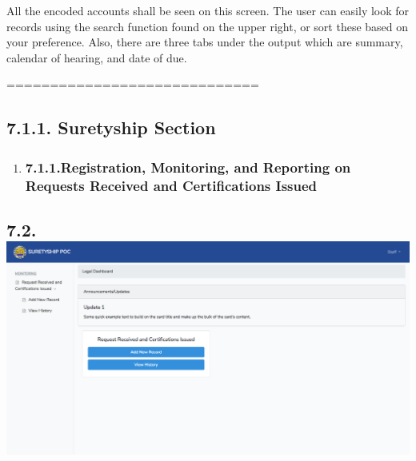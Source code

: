 \documentclass{article}
\begin{document}
\noindent{}All the encoded accounts shall be seen on this screen.
The user can easily look for records using the search function found on
the upper right, or sort these based on your preference. Also, there are
three tabs under the output which are summary, calendar of hearing, and
date of due.%

\mdhr{}%

\noindent{}=============================%

\subsection{7.1.\hspace*{0.5em}1.  Suretyship Section}\label{sec-1-suretyship-section}%

\begin{enumerate}[noitemsep,topsep=\mdcompacttopsep]%

\item{}
\subsubsection{7.1.1.\hspace*{0.5em}Registration, Monitoring, and Reporting on Requests Received and Certifications Issued}\label{sec-registration-monitoring-and-reporting-on-requests-received-and-certifications-issued}%
\end{enumerate}%

\subsection{7.2.\hspace*{0.5em}\includegraphics[keepaspectratio=true]{up-ic-screens/image34}{}}\label{sec-up-ic-screensimage34png}%
\end{document}
